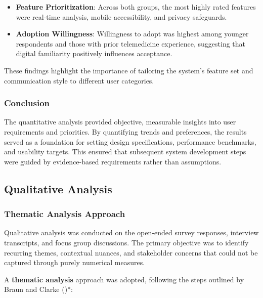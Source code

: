 \documentclass[
  12pt,
  oneside]{article}
\providecommand{\tightlist}{%
  \setlength{\itemsep}{0pt}\setlength{\parskip}{0pt}}
\begin{document}
\begin{itemize}
\tightlist
\item
  \textbf{Feature Prioritization}: Across both groups, the most highly
  rated features were real-time analysis, mobile accessibility, and
  privacy safeguards.
\item
  \textbf{Adoption Willingness}: Willingness to adopt was highest among
  younger respondents and those with prior telemedicine experience,
  suggesting that digital familiarity positively influences acceptance.
\end{itemize}

These findings highlight the importance of tailoring the system's
feature set and communication style to different user categories.

\subsubsection{Conclusion}\label{conclusion}

The quantitative analysis provided objective, measurable insights into
user requirements and priorities. By quantifying trends and preferences,
the results served as a foundation for setting design specifications,
performance benchmarks, and usability targets. This ensured that
subsequent system development steps were guided by evidence-based
requirements rather than assumptions.

\subsection{Qualitative Analysis}\label{qualitative-analysis}

\subsubsection{Thematic Analysis
Approach}\label{thematic-analysis-approach}

Qualitative analysis was conducted on the open-ended survey responses,
interview transcripts, and focus group discussions. The primary
objective was to identify recurring themes, contextual nuances, and
stakeholder concerns that could not be captured through purely numerical
measures.

A \textbf{thematic analysis} approach was adopted, following the steps
outlined by Braun and Clarke ()*:
\end{document}
